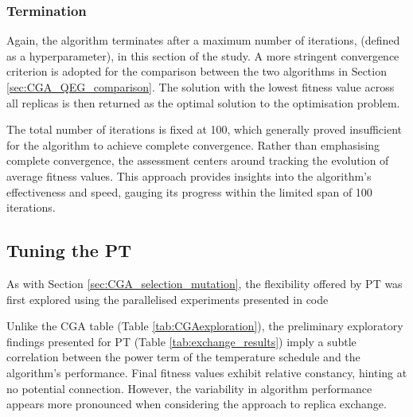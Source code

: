 \documentclass[10pt]{article}
\begin{document}
\begin{multicols}{2}
\subsubsection{Termination}

Again, the algorithm terminates after a maximum number of iterations, (defined as a hyperparameter), in this section of the study. A more stringent convergence criterion is adopted for the comparison between the two algorithms in Section \ref{sec:CGA_QEG_comparison}. The solution with the lowest fitness value across all replicas is then returned as the optimal solution to the optimisation problem.

The total number of iterations is fixed at 100, which generally proved insufficient for the algorithm to achieve complete convergence. Rather than emphasising complete convergence, the assessment centers around tracking the evolution of average fitness values. This approach provides insights into the algorithm's effectiveness and speed, gauging its progress within the limited span of 100 iterations.

\subsection{Tuning the PT}
\label{sec:PTtuning}

As with Section \ref{sec:CGA_selection_mutation}, the flexibility offered by PT was first explored using the parallelised experiments presented in code %

Unlike the CGA table (Table \ref{tab:CGAexploration}), the preliminary exploratory findings presented for PT (Table \ref{tab:exchange_results}) imply a subtle correlation between the power term of the temperature schedule and the algorithm's performance. Final fitness values exhibit relative constancy, hinting at no potential connection. However, the variability in algorithm performance appears more pronounced when considering the approach to replica exchange.


\end{multicols}
\end{document}
